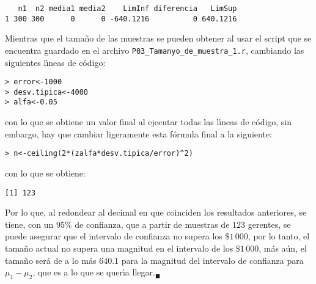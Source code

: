 \begin{solucion}
 \begin{verbatim}
   n1  n2 media1 media2    LimInf diferencia   LimSup
1 300 300      0      0 -640.1216          0 640.1216
 \end{verbatim}
 \vspace{-0.5cm}
 Mientras que el tama\~no de las muestras se pueden obtener al usar el script que se encuentra guardado en el archivo \texttt{P03\_Tamanyo\_de\_muestra\_1.r}, cambiando las siguientes l\'{\i}neas de c\'odigo:
 \begin{verbatim}
> error<-1000
> desv.tipica<-4000
> alfa<-0.05
 \end{verbatim}
 \vspace{-0.5cm}
 con lo que se obtiene un valor final al ejecutar todas las l\'{\i}neas de c\'odigo, sin embargo, hay que cambiar ligeramente esta f\'ormula final a la siguiente:
 \begin{verbatim}
> n<-ceiling(2*(zalfa*desv.tipica/error)^2)
 \end{verbatim}
 \vspace{-0.5cm}
 con lo que se obtiene:
 \begin{verbatim}
[1] 123
 \end{verbatim}
 \vspace{-0.5cm}
 Por lo que, al redondear al decimal en que coinciden los resultados anteriores, se tiene, con un $95\%$ de confianza, que a partir de muestras de $123$ gerentes, se puede asegurar que el intervalo de confianza no supera los $\$1\,000$, por lo tanto, el tama\~no actual no supera una magnitud en el intervalo de los $\$1\,000$, m\'as a\'un, el tama\~no ser\'a de a lo m\'as $640.1$ para la magnitud del intervalo de confianza para $\mu_1 - \mu_2$, que es a lo que se quer\'{\i}a llegar.${}_{\blacksquare}$
\end{solucion}
